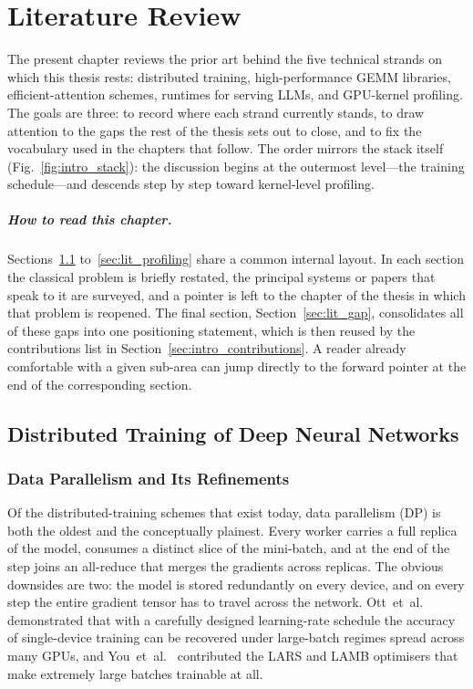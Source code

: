 \chapter{Literature Review}\label{ch:litreview}

The present chapter reviews the prior art behind the five technical
strands on which this thesis rests: distributed training,
high-performance GEMM libraries, efficient-attention schemes,
runtimes for serving LLMs, and GPU-kernel profiling. The goals are
three: to record where each strand currently stands, to draw
attention to the gaps the rest of the thesis sets out to close, and
to fix the vocabulary used in the chapters that follow. The order
mirrors the stack itself (Fig.~\ref{fig:intro_stack}): the discussion
begins at the outermost level---the training schedule---and descends
step by step toward kernel-level profiling.

\paragraph{How to read this chapter.} Sections~\ref{sec:lit_dist}
to~\ref{sec:lit_profiling} share a common internal layout. In each
section the classical problem is briefly restated, the principal
systems or papers that speak to it are surveyed, and a pointer is
left to the chapter of the thesis in which that problem is
reopened. The final section, Section~\ref{sec:lit_gap}, consolidates
all of these gaps into one positioning statement, which is then
reused by the contributions list in
Section~\ref{sec:intro_contributions}. A reader already comfortable
with a given sub-area can jump directly to the forward pointer at
the end of the corresponding section.

\section{Distributed Training of Deep Neural Networks}\label{sec:lit_dist}

\subsection{Data Parallelism and Its Refinements}\label{sec:lit_dp}
Of the distributed-training schemes that exist today, data
parallelism (DP) is both the oldest and the conceptually plainest.
Every worker carries a full replica of the model, consumes a distinct
slice of the mini-batch, and at the end of the step joins an
all-reduce that merges the gradients across replicas. The obvious
downsides are two: the model is stored redundantly on every device,
and on every step the entire gradient tensor has to travel across the
network. Ott~et~al.~\cite{ott2018fairseq} demonstrated that with a
carefully designed learning-rate schedule the accuracy of
single-device training can be recovered under large-batch regimes
spread across many GPUs, and You~et~al.~\cite{you2020lars} contributed
the LARS and LAMB optimisers that make extremely large batches
trainable at all.

